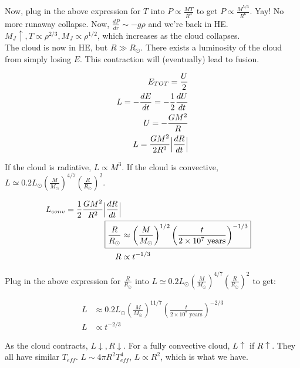 \documentclass[10pt,letterpaper,final]{book}
\newcommand{\pt}{\propto}
\newcommand{\rp}{\right)}
\newcommand{\lp}{\left(}
\begin{document}
Now, plug in the above expression for $T$ into $P \pt \frac{MT}{R^4}$ to get $P \pt \frac{M^{5/3}}{R^6}$. Yay! No more runaway collapse. Now, $\frac{dP}{dr} \sim -g\rho$ and we're back in HE. $M_J \uparrow, T\pt \rho^{2/3}, M_J \pt \rho^{1/2}$, which increases as the cloud collapses.\\

The cloud is now in HE, but $R \gg R_\odot$. There exists a luminosity of the cloud from simply losing $E$. This contraction will (eventually) lead to fusion.

\begin{align}
E_{TOT} = \frac{U}{2}\\
L = -\frac{dE}{dt} = -\frac{1}{2} \frac{dU}{dt}\\
U = -\frac{GM^2}{R}\\
L = \frac{GM^2}{2R^2} \Bigl\lvert \frac{dR}{dt} \Bigl\lvert
\end{align}

If the cloud is radiative, $L \pt M^3$. If the cloud is convective, $L \simeq 0.2 L_\odot \lp \frac{M}{M_\odot}\rp^{4/7} \lp \frac{R}{R_\odot}\rp^2$. 

\begin{align}
L_{conv} = \frac{1}{2}\frac{GM^2}{R^2} \Bigl\lvert \frac{dR}{dt} \Bigl\lvert\\
\Aboxed{\frac{R}{R_\odot} &\approx \lp \frac{M}{M_\odot}\rp^{1/2} \lp \frac{t}{2 \times 10^7 \text{ years}} \rp^{-1/3}}\\
R &\pt t^{-1/3}
\end{align}

Plug in the above expression for $\frac{R}{R_\odot}$ into $L \simeq 0.2 L_\odot \lp \frac{M}{M_\odot}\rp^{4/7} \lp \frac{R}{R_\odot}\rp^2$ to get:

\begin{align}
L&\approx 0.2 L_\odot \lp \frac{M}{M_\odot}\rp^{11/7} \lp \frac{t}{2 \times 10^7 \text{ years}}\rp^{-2/3}\\
L &\pt t^{-2/3}
\end{align}

As the cloud contracts, $L \downarrow, R \downarrow$. For a fully convective cloud, $L \uparrow$ if $R \uparrow$. They all have similar $T_{eff}$. $L \sim 4 \pi R^2 T_{eff}^4$, $L \pt R^2$, which is what we have.

\end{document}
